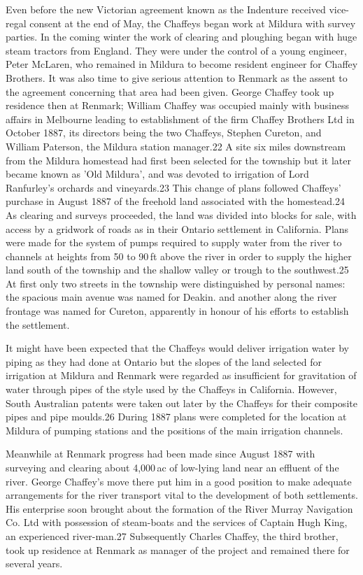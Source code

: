 Even before the new Victorian agreement known as the Indenture
received vice-regal consent at the end of May, the Chaffeys began work
at Mildura with survey parties.  In the coming winter the work of
clearing and ploughing began with huge steam tractors from England.
They were under the control of a young engineer, Peter McLaren, who
remained in Mildura to become resident engineer for Chaffey Brothers.
It was also time to give serious attention to Renmark as the assent to
the agreement concerning that area had been given.  George Chaffey
took up residence then at Renmark; William Chaffey was occupied mainly
with business affairs in Melbourne leading to establishment of the
firm Chaffey Brothers Ltd in October 1887, its directors being the two
Chaffeys, Stephen Cureton, and William Paterson, the Mildura station
manager.22 A site six miles downstream from the Mildura homestead had
first been selected for the township but it later became known as 'Old
Mildura', and was devoted to irrigation of Lord Ranfurley's orchards
and vineyards.23 This change of plans followed Chaffeys' purchase in
August 1887 of the freehold land associated with the homestead.24 As
clearing and surveys proceeded, the land was divided into blocks for
sale, with access by a gridwork of roads as in their Ontario
settlement in California.  Plans were made for the system of pumps
required to supply water from the river to channels at heights from 50
to 90\,ft above the river in order to supply the higher land south of
the township and the shallow valley or trough to the southwest.25 At
first only two streets in the township were distinguished by personal
names: the spacious main avenue was named for Deakin. and another
along the river frontage was named for Cureton, apparently in honour
of his efforts to establish the settlement.

It might have been expected that the Chaffeys would deliver irrigation
water by piping as they had done at Ontario but the slopes of the land
selected for irrigation at Mildura and Renmark were regarded as
insufficient for gravitation of water through pipes of the style used
by the Chaffeys in California.  However, South Australian patents were
taken out later by the Chaffeys for their composite pipes and pipe
moulds.26 During 1887 plans were completed for the location at Mildura
of pumping stations and the positions of the main irrigation channels.

Meanwhile at Renmark progress had been made since August 1887 with
surveying and clearing about 4,000\,ac of low-lying land near an
effluent of the river.  George Chaffey's move there put him in a good
position to make adequate arrangements for the river transport vital
to the development of both settlements.  His enterprise soon brought
about the formation of the River Murray Navigation Co. Ltd with
possession of steam-boats and the services of Captain Hugh King, an
experienced river-man.27 Subsequently Charles Chaffey, the third
brother, took up residence at Renmark as manager of the project and
remained there for several years.


